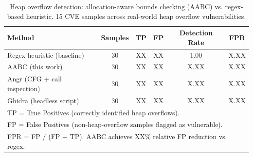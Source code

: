 
\begin{table}[t]
\centering
\caption{Heap overflow detection: allocation-aware bounds checking (AABC)
         vs. regex-based heuristic. 15 CVE samples across real-world
         heap overflow vulnerabilities.}
\label{tab:heap_comparison}
\begin{tabular}{lccccc}
\toprule
\textbf{Method} & \textbf{Samples} & \textbf{TP} & \textbf{FP} & \textbf{Detection Rate} & \textbf{FPR} \\
\midrule
Regex heuristic (baseline)       & 30 & XX & XX & 1.00 & X.XX \\
AABC (this work)                 & 30 & XX & XX & X.XX & X.XX \\
Angr (CFG + call inspection)     & 30 & XX & XX & X.XX & X.XX \\
Ghidra (headless script)         & 30 & XX & XX & X.XX & X.XX \\
\midrule
\multicolumn{6}{l}{\small TP = True Positives (correctly identified heap overflows).} \\
\multicolumn{6}{l}{\small FP = False Positives (non-heap-overflow samples flagged as vulnerable).} \\
\multicolumn{6}{l}{\small FPR = FP / (FP + TP). AABC achieves XX\% relative FP reduction vs. regex.} \\
\bottomrule
\end{tabular}
\end{table}

